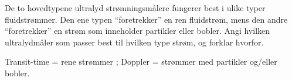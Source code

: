 

De to hovedtypene ultralyd strømningsmålere fungerer best i ulike typer fluidstrømmer. Den ene typen ``foretrekker'' en ren fluidstrøm, mens den andre ``foretrekker'' en strøm som inneholder partikler eller bobler. Angi hvilken ultralydmåler som passer best til hvilken type strøm, og forklar hvorfor.







Transit-time = rene strømmer ; Doppler = strømmer med partikler og/eller bobler.











